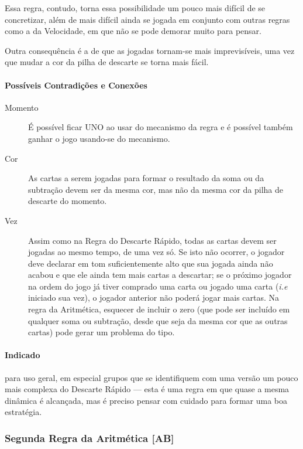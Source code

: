 Essa regra, contudo, torna essa possibilidade um pouco mais difícil de se concretizar, além de mais difícil ainda se jogada em conjunto com outras regras como a da Velocidade, em que não se pode demorar muito para pensar.

Outra consequência é a de que as jogadas tornam-se mais imprevisíveis, uma vez que mudar a cor da pilha de descarte se torna mais fácil.

\paragraph{Possíveis Contradições e Conexões}

\begin{description}
\item[Momento]{É possível ficar UNO ao usar do mecanismo da regra e é possível também ganhar o jogo usando-se do mecanismo.}
\item[Cor]{As cartas a serem jogadas para formar o resultado da soma ou da subtração devem ser da mesma cor, mas não da mesma cor da pilha de descarte do momento.}
\item[Vez]{Assim como na Regra do Descarte Rápido, todas as cartas devem ser jogadas ao mesmo tempo, de uma vez só. Se isto não ocorrer, o jogador deve declarar em tom suficientemente alto que sua jogada ainda não acabou e que ele ainda tem mais cartas a descartar; se o próximo jogador na ordem do jogo já tiver comprado uma carta ou jogado uma carta (\emph{i.e} iniciado sua vez), o jogador anterior não poderá jogar mais cartas. Na regra da Aritmética, esquecer de incluir o zero (que pode ser incluído em qualquer soma ou subtração, desde que seja da mesma cor que as outras cartas) pode gerar um problema do tipo.}
\end{description}

\paragraph{Indicado} 

para uso geral, em especial grupos que se identifiquem com uma versão um pouco mais complexa do Descarte Rápido --- esta é uma regra em que quase a mesma dinâmica é alcançada, mas é preciso pensar com cuidado para formar uma boa estratégia.

\subsubsection{Segunda Regra da Aritmética [AB]}

